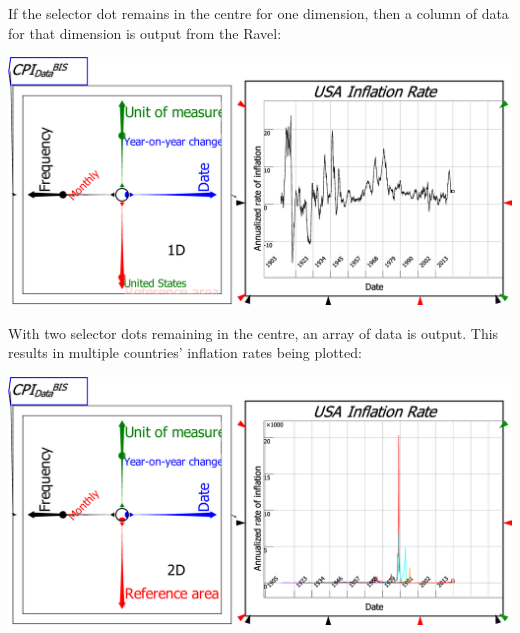 If the selector dot remains in the centre for one dimension, then
a column of data for that dimension is output from the Ravel:

\noindent\includegraphics[width=\textwidth]{images/RavelDataSeriesSelected}

With two selector dots remaining in the centre, an array of data is
output. This results in multiple countries' inflation rates being
plotted:

\noindent\includegraphics[width=\textwidth]{images/RavelData2SeriesSelected}

